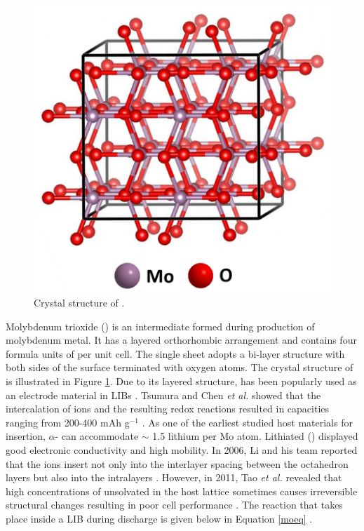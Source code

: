  \begin{figure}[th!]
  \centering
  \includegraphics[width=\textwidth]{Figures/chap6fig/MoO3crys}
    \caption{Crystal structure of .}
  \label{Figures/chap6fig:MoO3crys}
\end{figure}

Molybdenum trioxide () is an intermediate formed during production of molybdenum metal. It has a layered orthorhombic arrangement and contains four formula units of  per unit cell. The single sheet adopts a bi-layer structure with both sides of the surface terminated with oxygen atoms. The crystal structure of  is illustrated in Figure \ref{Figures/chap6fig:MoO3crys}. Due to its layered structure,  has been popularly used as an electrode material in LIBs \cite{wu_mixed_2017, li_vapor-transportation_2006, tsumura_lithium_1997}. Tsumura and Chen \textit{et al.} showed that the intercalation of  ions and the resulting redox reactions resulted in capacities ranging from 200-400 mAh g$^{-1}$ \cite{tsumura_lithium_1997, chen_fast_2010, zhou_-moo3_2010}. As one of the earliest studied host materials for  insertion, $\alpha$- can accommodate $\sim$ 1.5 lithium per Mo atom. Lithiated  () displayed good electronic conductivity and high  mobility. In 2006, Li and his team reported that the  ions insert not only into the interlayer spacing between the  octahedron layers but also into the  intralayers \cite{li_vapor-transportation_2006, chen_fast_2010}. However, in 2011, Tao \textit{et al.} revealed that high concentrations of unsolvated  in the host lattice sometimes causes irreversible structural changes resulting in poor cell performance \cite{tao_moo3_2011, li_theoretical_2014}. The reaction that takes place inside a LIB during discharge is given below in Equation \ref{moeq} \cite{li_vapor-transportation_2006}. 

